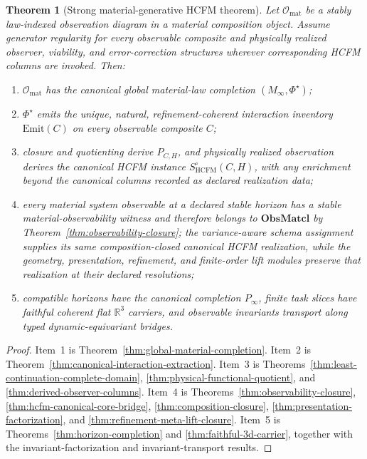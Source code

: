 \documentclass[11pt]{article}
\newtheorem{theorem}{Theorem}
\theoremstyle{definition}
\newcommand{\ObsMatcl}{\mathbf{ObsMatcl}}
\newcommand{\Omat}{\mathcal{O}_{\mathrm{mat}}}
\newcommand{\Minf}{M_\infty}
\begin{document}
\begin{theorem}[Strong material-generative HCFM theorem]
\label{thm:strong-material-generative-hcfm}
Let $\Omat$ be a stably law-indexed observation diagram in a material composition object. Assume generator regularity for every observable composite and physically realized observer, viability, and error-correction structures wherever corresponding HCFM columns are invoked. Then:
\begin{enumerate}[label=\arabic*.]
\item $\Omat$ has the canonical global material-law completion $(\Minf, \Phi^{\star})$;
\item $\Phi^{\star}$ emits the unique, natural, refinement-coherent interaction inventory $\mathrm{Emit}(C)$ on every observable composite $C$;
\item closure and quotienting derive $P_{C,H}$, and physically realized observation derives the canonical HCFM instance $S^{\circ}_{\mathrm{HCFM}}(C, H)$, with any enrichment beyond the canonical columns recorded as declared realization data;
\item every material system observable at a declared stable horizon has a
stable material-observability witness and therefore belongs to
\(\ObsMatcl\) by Theorem~\ref{thm:observability-closure}; the
variance-aware schema assignment supplies its same composition-closed canonical
HCFM realization, while the geometry, presentation, refinement, and
finite-order lift modules preserve that realization at their declared
resolutions;
\item compatible horizons have the canonical completion $P_\infty$, finite task slices have faithful coherent flat $\mathbb{R}^3$ carriers, and observable invariants transport along typed dynamic-equivariant bridges.
\end{enumerate}
\end{theorem}

\begin{proof}
Item~1 is Theorem~\ref{thm:global-material-completion}. Item~2 is
Theorem~\ref{thm:canonical-interaction-extraction}. Item~3 is
Theorems~\ref{thm:least-continuation-complete-domain},
\ref{thm:physical-functional-quotient}, and
\ref{thm:derived-observer-columns}. Item~4 is
Theorems~\ref{thm:observability-closure},
\ref{thm:hcfm-canonical-core-bridge},
\ref{thm:composition-closure},
\ref{thm:presentation-factorization}, and
\ref{thm:refinement-meta-lift-closure}. Item~5 is
Theorems~\ref{thm:horizon-completion} and \ref{thm:faithful-3d-carrier},
together with the invariant-factorization and invariant-transport results.
\end{proof}
\end{document}

